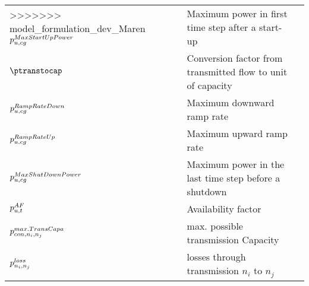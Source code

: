 \begin{longtable}{p{\cola} p{\colc} >{\small\raggedleft\arraybackslash\itshape}p{\colb}}
>>>>>>> model_formulation_dev_Maren
		$p^{MaxStartUpPower}_{u,cg}$	& Maximum power in first time step after a start-up           	&                \\
		$\ptranstocap   $	& Conversion factor from transmitted flow to unit of capacity 	&                \\
		$p^{RampRateDown}_{u,cg} $	& Maximum downward ramp rate                                  	&                \\
		$p^{RampRateUp}_{u,cg}   $	& Maximum upward ramp rate                                    	&                \\
		$p^{MaxShutDownPower}_{u,cg}$	& Maximum power in the last time step before a shutdown       	&                \\
		$p^{AF}_{u,t}           $	& Availability factor                                         	&                \\[0.5em]

		$p^{max.TransCapa}_{{con},n_i,n_j} $	& max. possible transmission Capacity                         	&                \\
		$p^{loss}_{n_i,n_j}    $	& losses through transmission $n_i$ to $n_j$                  	&                \\
	\end{longtable}

